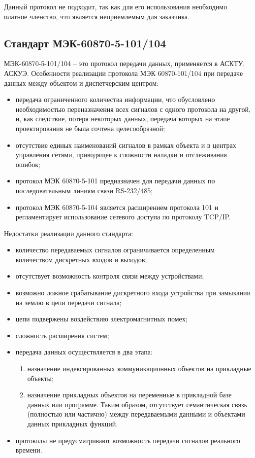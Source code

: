 Данный протокол не подходит, так как для его использования необходимо платное членство, что является неприемлемым для заказчика.

\subsection{Стандарт МЭК-60870-5-101/104}

МЭК-60870-5-101/104 – это протокол передачи данных, применяется в АСКТУ, АСКУЭ. Особенности реализации протокола МЭК 60870-101/104 при передаче данных между объектом и диспетчерским центром:

\begin{itemize}
 \item передача ограниченного количества информации, что обусловлено необходимостью переназначения всех сигналов с одного протокола на другой, и, как следствие, потеря некоторых данных, передача которых на этапе проектирования не была сочтена целесообразной;
 \item отсутствие единых наименований сигналов в рамках объекта и в центрах управления сетями, приводящее к сложности наладки и отслеживания ошибок;
 \item протокол МЭК 60870-5-101 предназначен для передачи данных по последовательным линиям связи RS-232/485;
 \item протокол МЭК 60870-5-104 является расширением протокола 101 и регламентирует использование сетевого доступа по протоколу TCP/IP.
\end{itemize}

Недостатки реализации данного стандарта:

\begin{itemize}
 \item количество передаваемых сигналов ограничивается определенным количеством дискретных входов и выходов;
 \item отсутствует возможность контроля связи между устройствами;
 \item возможно ложное срабатывание дискретного входа устройства при замыкании на землю в цепи передачи сигнала;
 \item цепи подвержены воздействию электромагнитных помех;
 \item сложность расширения систем;
 \item передача данных осуществляется в два этапа:
 \begin{enumerate}
  \item назначение индексированных коммуникационных объектов на прикладные объекты;
  \item  назначение прикладных объектов на переменные в прикладной базе данных или программе. Таким образом, отсутствует семантическая связь (полностью или частично) между передаваемыми данными и объектами данных прикладных функций.
 \end{enumerate}
 \item протоколы не предусматривают возможность передачи сигналов реального времени.
\end{itemize}

